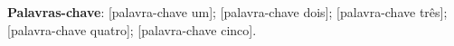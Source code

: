 %

\begin{resumo}

   \vspace{\onelineskip}
   \noindent
   \textbf{Palavras-chave}: [palavra-chave um]; [palavra-chave dois];
[palavra-chave três]; [palavra-chave quatro]; [palavra-chave cinco].
\end{resumo}
